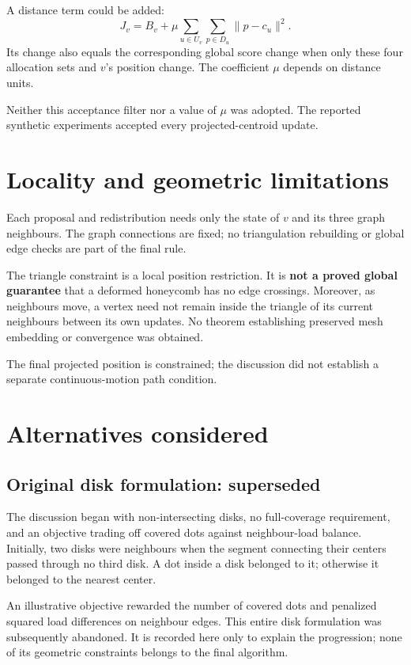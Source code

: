 \documentclass[11pt]{article}
\begin{document}
A distance term could be added:
\[
J_v=B_v+\mu\sum_{u\in U_v}\sum_{p\in D_u}\|p-c_u\|^2.
\]
Its change also equals the corresponding global score change when only these four allocation sets and $v$'s position change. The coefficient $\mu$ depends on distance units.

Neither this acceptance filter nor a value of $\mu$ was adopted. The reported synthetic experiments accepted every projected-centroid update.

\section{Locality and geometric limitations}
Each proposal and redistribution needs only the state of $v$ and its three graph neighbours. The graph connections are fixed; no triangulation rebuilding or global edge checks are part of the final rule.

The triangle constraint is a local position restriction. It is \textbf{not a proved global guarantee} that a deformed honeycomb has no edge crossings. Moreover, as neighbours move, a vertex need not remain inside the triangle of its current neighbours between its own updates. No theorem establishing preserved mesh embedding or convergence was obtained.

The final projected position is constrained; the discussion did not establish a separate continuous-motion path condition.

\section{Alternatives considered}
\subsection{Original disk formulation: superseded}
The discussion began with non-intersecting disks, no full-coverage requirement, and an objective trading off covered dots against neighbour-load balance. Initially, two disks were neighbours when the segment connecting their centers passed through no third disk. A dot inside a disk belonged to it; otherwise it belonged to the nearest center.

An illustrative objective rewarded the number of covered dots and penalized squared load differences on neighbour edges. This entire disk formulation was subsequently abandoned. It is recorded here only to explain the progression; none of its geometric constraints belongs to the final algorithm.
\end{document}
